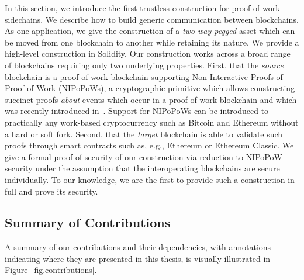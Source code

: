 \ifdraft
{}
In this section, we introduce the first
trustless construction for proof-of-work sidechains. We describe how to build
generic communication between blockchains. As one application, we give the
construction of a \emph{two-way pegged} asset which can be moved from one
blockchain to another while retaining its nature. We provide a high-level
construction in Solidity. Our construction works across a broad range of
blockchains requiring only two underlying properties. First, that the
\emph{source} blockchain is a proof-of-work blockchain supporting
Non-Interactive Proofs of Proof-of-Work (NIPoPoWs), a cryptographic primitive
which allows constructing succinct proofs \emph{about} events which occur in a
proof-of-work blockchain and which was recently introduced in~\cite{nipopows}.
Support for NIPoPoWs can be introduced to practically any
work-based cryptocurrency such as Bitcoin and Ethereum without a hard or soft
fork. Second, that the \emph{target} blockchain is able to validate such proofs
through smart contracts such as, e.g., Ethereum or Ethereum
Classic.
We give a formal proof of security of our construction via
reduction to NIPoPoW security under the assumption that the interoperating
blockchains are secure individually.
To our knowledge, we are the first to
provide such a construction in
full and prove its security.
\fi

\subsection{Summary of Contributions}
A summary of our contributions and their dependencies, with annotations
indicating where they are presented in this thesis, is visually illustrated in
Figure~\ref{fig.contributions}.

